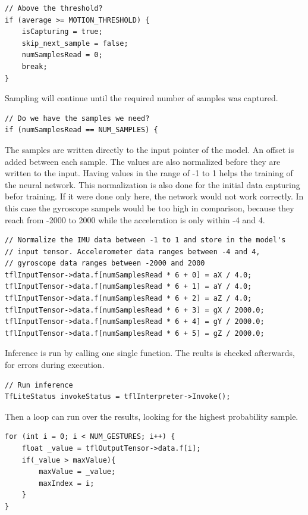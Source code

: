\documentclass[a4paper,titlepage]{article}
\begin{document}
\begin{lstlisting}
// Above the threshold?
if (average >= MOTION_THRESHOLD) {
    isCapturing = true;
    skip_next_sample = false;
    numSamplesRead = 0;
    break;
}
\end{lstlisting}

Sampling will continue until the required number of samples was captured.

\begin{lstlisting}
// Do we have the samples we need?
if (numSamplesRead == NUM_SAMPLES) {
\end{lstlisting}

The samples are written directly to the input pointer of the model.
An offset is added between each sample.
The values are also normalized before they are written to the input.
Having values in the range of -1 to 1 helps the training of the neural network.
This normalization is also done for the initial data capturing befor training.
If it were done only here, the network would not work correctly.
In this case the gyroscope sampels would be too high in comparison, because they reach from -2000 to 2000 while the acceleration is only within -4 and 4.

\begin{lstlisting}
// Normalize the IMU data between -1 to 1 and store in the model's
// input tensor. Accelerometer data ranges between -4 and 4,
// gyroscope data ranges between -2000 and 2000
tflInputTensor->data.f[numSamplesRead * 6 + 0] = aX / 4.0;
tflInputTensor->data.f[numSamplesRead * 6 + 1] = aY / 4.0;
tflInputTensor->data.f[numSamplesRead * 6 + 2] = aZ / 4.0;
tflInputTensor->data.f[numSamplesRead * 6 + 3] = gX / 2000.0;
tflInputTensor->data.f[numSamplesRead * 6 + 4] = gY / 2000.0;
tflInputTensor->data.f[numSamplesRead * 6 + 5] = gZ / 2000.0;
\end{lstlisting}

Inference is run by calling one single function.
The reults is checked afterwards, for errors during execution.

\begin{lstlisting}
// Run inference
TfLiteStatus invokeStatus = tflInterpreter->Invoke();
\end{lstlisting}

Then a loop can run over the results, looking for the highest probability sample.

\begin{lstlisting}
for (int i = 0; i < NUM_GESTURES; i++) {
    float _value = tflOutputTensor->data.f[i];
    if(_value > maxValue){
        maxValue = _value;
        maxIndex = i;
    }
}
\end{lstlisting}
\end{document}
